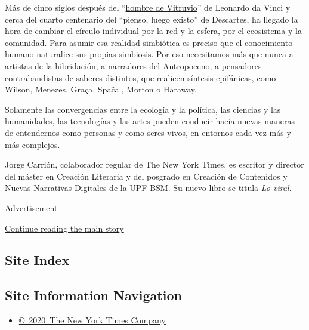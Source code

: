 Más de cinco siglos después del
``\href{https://www.bbc.com/mundo/noticias-50095330}{hombre de
Vitruvio}'' de Leonardo da Vinci y cerca del cuarto centenario del
``pienso, luego existo'' de Descartes, ha llegado la hora de cambiar el
círculo individual por la red y la esfera, por el ecosistema y la
comunidad. Para asumir esa realidad simbiótica es preciso que el
conocimiento humano naturalice sus propias simbiosis. Por eso
necesitamos más que nunca a artistas de la hibridación, a narradores del
Antropoceno, a pensadores contrabandistas de saberes distintos, que
realicen síntesis epifánicas, como Wilson, Menezes, Graça, Spačal,
Morton o Haraway.

Solamente las convergencias entre la ecología y la política, las
ciencias y las humanidades, las tecnologías y las artes pueden conducir
hacia nuevas maneras de entendernos como personas y como seres vivos, en
entornos cada vez más y más complejos.

Jorge Carrión, colaborador regular de The New York Times, es escritor y
director del máster en Creación Literaria y del posgrado en Creación de
Contenidos y Nuevas Narrativas Digitales de la UPF-BSM. Su nuevo libro
se titula \emph{Lo viral}.

Advertisement

\protect\hyperlink{after-bottom}{Continue reading the main story}

\hypertarget{site-index}{%
\subsection{Site Index}\label{site-index}}

\hypertarget{site-information-navigation}{%
\subsection{Site Information
Navigation}\label{site-information-navigation}}

\begin{itemize}
\tightlist
\item
  \href{https://help.nytimes3xbfgragh.onion/hc/en-us/articles/115014792127-Copyright-notice}{©~2020~The
  New York Times Company}
\end{itemize}

